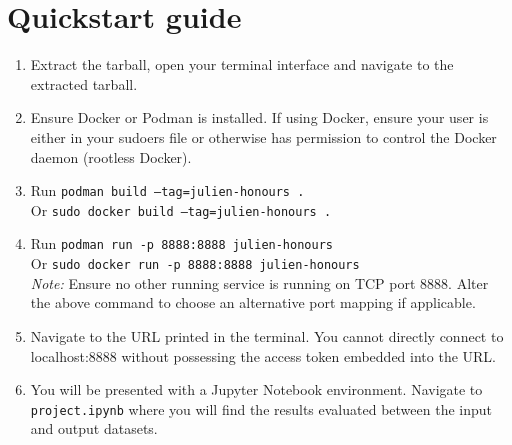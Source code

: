 \section{Quickstart guide}
\begin{enumerate}
    \item Extract the tarball, open your terminal interface and navigate to the extracted tarball.
    \item Ensure Docker or Podman is installed. If using Docker, ensure your user is either in your sudoers file or otherwise has permission to control the Docker daemon (rootless Docker).
    \item Run \texttt{podman build --tag=julien-honours .} \\
    Or \texttt{sudo docker build --tag=julien-honours .}
    \item Run \texttt{podman run -p 8888:8888 julien-honours} \\
    Or \texttt{sudo docker run -p 8888:8888 julien-honours} \\
    \textit{Note:} Ensure no other running service is running on TCP port 8888. Alter the above command to choose an alternative port mapping if applicable.
    \item Navigate to the URL printed in the terminal. You cannot directly connect to localhost:8888 without possessing the access token embedded into the URL.
    \item You will be presented with a Jupyter Notebook environment. Navigate to \texttt{project.ipynb} where you will find the results evaluated between the input and output datasets. 
\end{enumerate}